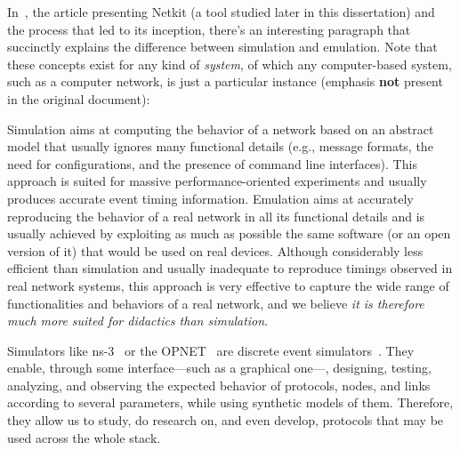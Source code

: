 

In~\cite{netkit-full}, the article presenting Netkit (a tool studied later in this dissertation) and the process that led to its inception, there's an interesting paragraph that succinctly explains the difference between simulation and emulation.
Note that these concepts exist for any kind of \emph{system}, of which any computer-based system, such as a computer network, is just a particular instance (emphasis \textbf{not} present in the original document):
\begin{displayquote}
Simulation aims at computing the behavior of a network based on an abstract model that usually ignores many functional details (e.g., message formats, the need for configurations, and the presence of command line interfaces).
This approach is suited for massive performance-oriented experiments and usually produces accurate event timing information.
Emulation aims at accurately reproducing the behavior of a real network in all its functional details and is usually achieved by exploiting as much as possible the same software (or an open version of it) that would be used on real devices.
Although considerably less efficient than simulation and usually inadequate to reproduce timings observed in real network systems, this approach is very effective to capture the wide range of functionalities and behaviors of a real network, and we believe \emph{it is therefore much more suited for didactics than simulation}.
\end{displayquote}
Simulators like ns-3~\cite{ns3} or the OPNET~\cite{introtoopnet} are discrete event simulators~\cite{netsimoremu}.
They enable, through some interface---such as a graphical one---, designing, testing, analyzing, and observing the expected behavior of protocols, nodes, and links according to several parameters, while using synthetic models of them. Therefore, they allow us to study, do research on, and even develop, protocols that may be used across the whole stack.

